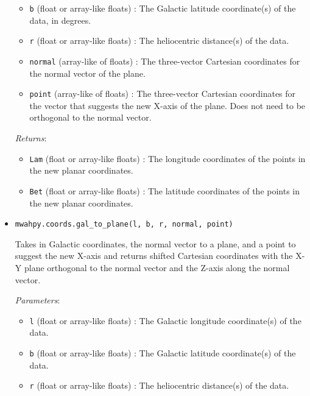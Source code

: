 \documentclass{article}
\begin{document}
\begin{itemize}
\begin{itemize}
\item \verb!b! (float or array-like floats) : The Galactic latitude coordinate(s) of the data, in degrees.

\item \verb!r! (float or array-like floats) : The heliocentric distance(s) of the data.

\item \verb!normal! (array-like of floats) : The three-vector Cartesian coordinates for the normal vector of the plane.

\item \verb!point! (array-like of floats) : The three-vector Cartesian coordinates for the vector that suggests the new X-axis of the plane. Does not need to be orthogonal to the normal vector.

\end{itemize}

\textit{Returns}: \begin{itemize}

\item \verb!Lam! (float or array-like floats) : The longitude coordinates of the points in the new planar coordinates.

\item \verb!Bet! (float or array-like floats) : The latitude coordinates of the points in the new planar coordinates.

\end{itemize}



\item \verb!mwahpy.coords.gal_to_plane(l, b, r, normal, point)!

Takes in Galactic coordinates, the normal vector to a plane, and a point to suggest the new X-axis and returns shifted Cartesian coordinates with the X-Y plane orthogonal to the normal vector and the Z-axis along the normal vector. 

\textit{Parameters}: \begin{itemize}

\item \verb!l! (float or array-like floats) : The Galactic longitude coordinate(s) of the data.

\item \verb!b! (float or array-like floats) : The Galactic latitude coordinate(s) of the data.

\item \verb!r! (float or array-like floats) : The heliocentric distance(s) of the data.


\end{itemize}
\end{itemize}
\end{document}
